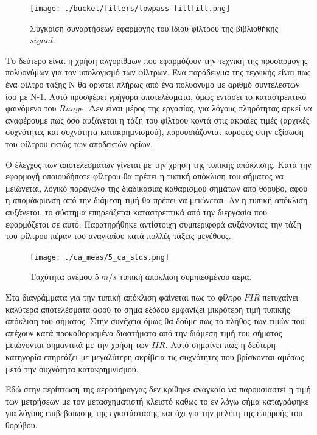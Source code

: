 \documentclass[breaklines=true, 12pt]{article}
\begin{document}
{{{\begin{figure}[htbp]
\centering
\texttt{[image: ./bucket/filters/lowpass-filtfilt.png]}
\caption{Σύγκριση συναρτήσεων εφαρμογής του ίδιου φίλτρου της βιβλιοθήκης \(signal\).}
\end{figure}

Το δεύτερο είναι η χρήση αλγορίθμων που εφαρμόζουν την τεχνική της προσαρμογής
πολυονύμων για τον υπολογισμό των φίλτρων. Ένα παράδειγμα της τεχνικής είναι
πως ένα φίλτρο τάξης Ν θα οριστεί πλήρως από ένα πολυόνυμο με αριθμό
συντελεστών ίσο με Ν-1. Αυτό προσφέρει γρήγορα αποτελέσματα, όμως εντάσει το
καταστρεπτικό φαινόμενο του \(Runge\). Δεν είναι μέρος της εργασίας, για λόγους
πληρότητας αρκεί να αναφέρουμε πως όσο αυξάνεται η τάξη του φίλτρου κοντά
στις ακραίες τιμές (αρχικές συχνότητες και συχνότητα κατακρημνισμού),
παρουσιάζονται κορυφές στην εξίσωση του φίλτρου εκτώς των αποδεκτών ορίων.

\clearpage
Ο έλεγχος των αποτελεσμάτων γίνεται με την χρήση της τυπικής απόκλισης. Κατά
την εφαρμογή οποιουδήποτε φίλτρου θα πρέπει η τυπική απόκλιση του σήματος να
μειώνεται, λογικό παράγωγο της διαδικασίας καθαρισμού σημάτων από θόρυβο, αφού
η απομάκρυνση από την διάμεση τιμή θα πρέπει να μειώνεται. Αν η τυπική απόκλιση
αυξάνεται, το σύστημα επηρεάζεται καταστρεπτικά από την διεργασία που
εφαρμόζεται σε αυτό. Παρατηρήθηκε αντίστοιχη συμπεριφορά αυξάνοντας την τάξη
του φίλτρου πέραν του αναγκαίου κατά πολλές τάξεις μεγέθους.

\begin{figure}[h]
\centerline{\texttt{[image: ./ca\_meas/5\_ca\_stds.png]}}
\caption{Ταχύτητα ανέμου \(5\ m/s\) τυπική απόκλιση συμπιεσμένου αέρα.}
\label{fig:ca-0-std}
\end{figure}

Στα διαγράμματα για την τυπική απόκλιση φαίνεται πως το φίλτρο \(FIR\)
πετυχαίνει καλύτερα αποτελέσματα αφού το σήμα εξόδου εμφανίζει μικρότερη τιμή
τυπικής απόκλιση του σήματος. Στην συνέχεια όμως θα δούμε πως το πλήθος των
τιμών που απέχουν κατά προκαθορισμένα διαστήματα από την διάμεση τιμή του σήματος
μειώνονται σημαντικά με την χρήση των \(IIR\). Αυτό σημαίνει πως η δεύτερη
κατηγορία επηρεάζει με μεγαλύτερη ακρίβεια τις συχνότητες που βρίσκονται
αμέσως μετά την συχνότητα κατακρημνισμού.

Εδώ στην περίπτωση της αεροσήραγγας δεν κρίθηκε αναγκαίο να παρουσιαστεί
η τιμή των μετρήσεων με τον μετασχηματιστή κλειστό καθως το εν λόγω σήμα
καταγράφηκε για λόγους επιβεβαίωσης της εγκατάστασης και όχι για την μελέτη
της επιρροής του θορύβου.

}}}
\end{document}
